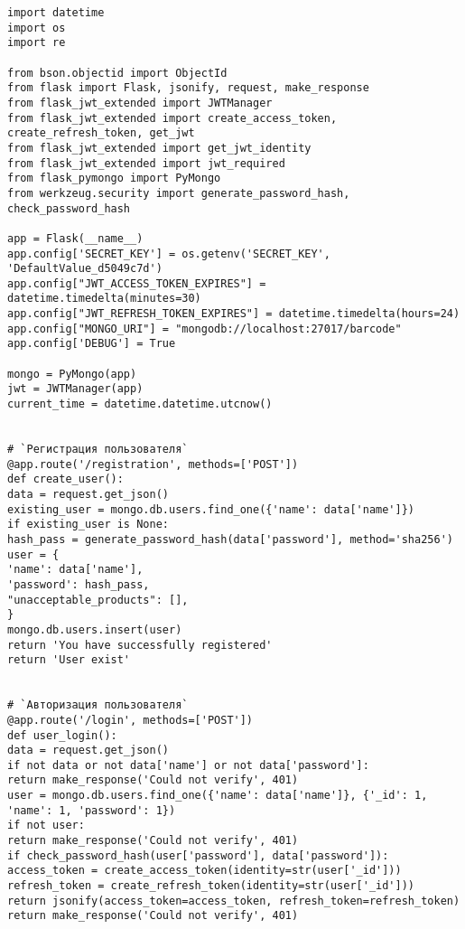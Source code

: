 \vspace*{\fill}
\vspace*{\fill}

\clearpage

\vspace{\baselineskip}

\begin{lstlisting}
import datetime
import os
import re

from bson.objectid import ObjectId
from flask import Flask, jsonify, request, make_response
from flask_jwt_extended import JWTManager
from flask_jwt_extended import create_access_token, create_refresh_token, get_jwt
from flask_jwt_extended import get_jwt_identity
from flask_jwt_extended import jwt_required
from flask_pymongo import PyMongo
from werkzeug.security import generate_password_hash, check_password_hash

app = Flask(__name__)
app.config['SECRET_KEY'] = os.getenv('SECRET_KEY', 'DefaultValue_d5049c7d')
app.config["JWT_ACCESS_TOKEN_EXPIRES"] = datetime.timedelta(minutes=30)
app.config["JWT_REFRESH_TOKEN_EXPIRES"] = datetime.timedelta(hours=24)
app.config["MONGO_URI"] = "mongodb://localhost:27017/barcode"
app.config['DEBUG'] = True

mongo = PyMongo(app)
jwt = JWTManager(app)
current_time = datetime.datetime.utcnow()


# `Регистрация пользователя`
@app.route('/registration', methods=['POST'])
def create_user():
data = request.get_json()
existing_user = mongo.db.users.find_one({'name': data['name']})
if existing_user is None:
hash_pass = generate_password_hash(data['password'], method='sha256')
user = {
'name': data['name'],
'password': hash_pass,
"unacceptable_products": [],
}
mongo.db.users.insert(user)
return 'You have successfully registered'
return 'User exist'


# `Авторизация пользователя`
@app.route('/login', methods=['POST'])
def user_login():
data = request.get_json()
if not data or not data['name'] or not data['password']:
return make_response('Could not verify', 401)
user = mongo.db.users.find_one({'name': data['name']}, {'_id': 1, 'name': 1, 'password': 1})
if not user:
return make_response('Could not verify', 401)
if check_password_hash(user['password'], data['password']):
access_token = create_access_token(identity=str(user['_id']))
refresh_token = create_refresh_token(identity=str(user['_id']))
return jsonify(access_token=access_token, refresh_token=refresh_token)
return make_response('Could not verify', 401)



\end{lstlisting}
